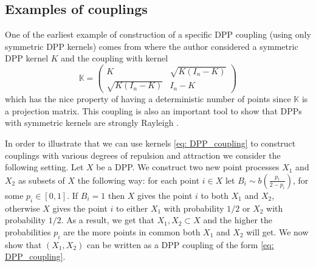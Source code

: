 \documentclass{article}
\numberwithin{equation}{section}
\theoremstyle{plain}
\begin{document}
\subsection{Examples of couplings}

One of the earliest example of construction of a specific DPP coupling (using only symmetric DPP kernels) comes from \cite{Lyons} where the author considered a symmetric DPP kernel $K$ and the coupling with kernel
\[\mathbb{K}=\begin{pmatrix}K & \sqrt{K(I_n-K)}\\
\sqrt{K(I_n-K)} & I_n-K
\end{pmatrix}\]
which has the nice property of having a deterministic number of points since $\mathbb{K}$ is a projection matrix. This coupling is also an important tool to show that DPPs with symmetric kernels are strongly Rayleigh \cite{Borcea}. 

\medskip

\noindent In order to illustrate that we can use kernels \eqref{eq: DPP_coupling} to construct couplings with various degrees of repulsion and attraction we consider the following setting. Let $X$ be a DPP. We construct two new point processes $X_1$ and $X_2$ as subsets of $X$ the following way: for each point $i\in X$ let $B_i\sim b(\frac{p_i}{2-p_i})$, for some $p_i\in [0, 1]$. If $B_i=1$ then $X$ gives the point $i$ to both $X_1$ and $X_2$, otherwise $X$ gives the point $i$ to either $X_1$ with probability $1/2$ or $X_2$ with probability $1/2$. As a result, we get that $X_1, X_2\subset X$ and the higher the probabilities $p_i$ are the more points in common both $X_1$ and $X_2$ will get. We now show that $(X_1, X_2)$ can be written as a DPP coupling of the form \eqref{eq: DPP_coupling}.
\end{document}
